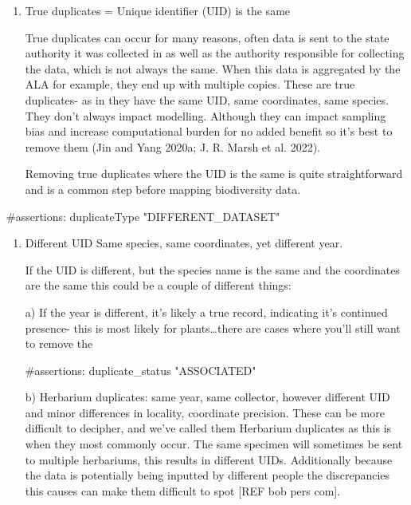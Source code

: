 \documentclass[
  letterpaper,
  DIV=11,
  numbers=noendperiod,
  oneside]{scrreprt}
\newenvironment{Shaded}{\begin{snugshade}}{\end{snugshade}}
\newcommand{\CommentTok}[1]{\textcolor[rgb]{0.37,0.37,0.37}{#1}}
\begin{document}
\begin{enumerate}
\def\labelenumi{\arabic{enumi}.}
\item
  True duplicates = Unique identifier (UID) is the same

  True duplicates can occur for many reasons, often data is sent to the
  state authority it was collected in as well as the authority
  responsible for collecting the data, which is not always the same.
  When this data is aggregated by the ALA for example, they end up with
  multiple copies. These are true duplicates- as in they have the same
  UID, same coordinates, same species. They don't always impact
  modelling. Although they can impact sampling bias and increase
  computational burden for no added benefit so it's best to remove them
  (Jin and Yang 2020a; J. R. Marsh et al. 2022).

  Removing true duplicates where the UID is the same is quite
  straightforward and is a common step before mapping biodiversity data.
\end{enumerate}

\begin{Shaded}
\begin{Highlighting}[]
\CommentTok{\#assertions: duplicateType "DIFFERENT\_DATASET"}
\end{Highlighting}
\end{Shaded}

\begin{enumerate}
\def\labelenumi{\arabic{enumi}.}
\setcounter{enumi}{1}
\item
  Different UID Same species, same coordinates, yet different year.

  If the UID is different, but the species name is the same and the
  coordinates are the same this could be a couple of different things:

  a) If the year is different, it's likely a true record, indicating
  it's continued presence- this is most likely for plants\ldots there
  are cases where you'll still want to remove the

\begin{Shaded}
\begin{Highlighting}[]
\CommentTok{\#assertions: duplicate\_status "ASSOCIATED"}
\end{Highlighting}
\end{Shaded}

  b) Herbarium duplicates: same year, same collector, however different
  UID and minor differences in locality, coordinate precision. These can
  be more difficult to decipher, and we've called them Herbarium
  duplicates as this is when they most commonly occur. The same specimen
  will sometimes be sent to multiple herbariums, this results in
  different UIDs. Additionally because the data is potentially being
  inputted by different people the discrepancies this causes can make
  them difficult to spot {[}REF bob pers com{]}.
\end{enumerate}
\end{document}

